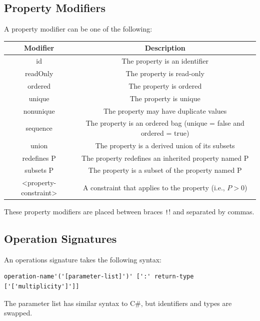 \documentclass{article}
\begin{document}
\subsection{Property Modifiers}
A property modifier can be one of the following:
\begin{table}[H]
    \centering
    \begin{tabular}{c c}
        \toprule
        \textbf{Modifier}     & \textbf{Description}                                               \\
        \midrule
        id                    & The property is an identifier                                      \\
        readOnly              & The property is read-only                                          \\
        ordered               & The property is ordered                                            \\
        unique                & The property is unique                                             \\
        nonunique             & The property may have duplicate values                             \\
        sequence              & The property is an ordered bag (unique = false and ordered = true) \\
        union                 & The property is a derived union of its subsets                     \\
        redefines P           & The property redefines an inherited property named P               \\
        subsets P             & The property is a subset of the property named P                   \\
        <property-constraint> & A constraint that applies to the property (i.e., \(P>0\))          \\
        \bottomrule
    \end{tabular}
\end{table}
These property modifiers are placed between braces \texttt!{}! and separated by commas.
\subsection{Operation Signatures}
An operations signature takes the following syntax:
\begin{verbatim}
operation-name'('[parameter-list]')' [':' return-type ['['multiplicity']']]
\end{verbatim}
The parameter list has similar syntax to C\#, but identifiers and types
are swapped.
\end{document}
